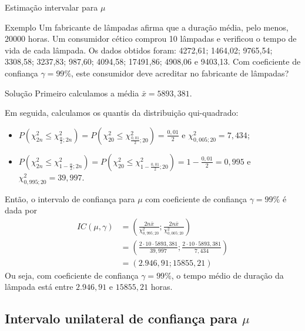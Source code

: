 \documentclass[8pt]{beamer}
\begin{document}
\begin{frame}{Estimação intervalar para $\mu$}

\footnotesize

\begin{block}{Exemplo}
	Um fabricante de lâmpadas afirma que a duração média, pelo menos, $20000$  horas. Um consumidor cético comprou 10 lâmpadas e verificou o tempo de vida de cada lâmpada. Os dados obtidos foram: 4272,61;  1464,02;  9765,54;  3308,58;  3237,83;   987,60;  4094,58; 17491,86;  4908,06 e  9403,13. Com coeficiente de confiança $\gamma=99\%$, este consumidor deve acreditar no fabricante de lâmpadas?
\end{block}

\begin{block}{Solução}
	Primeiro calculamos a média $\bar{x} = 5893,381$.
	
	Em seguida, calculamos os quantis da distribuição qui-quadrado:
	\begin{itemize}
		\item $P\left(\chi^2_{2n} \leq \chi^2_{\frac{\alpha}{2};2n}\right) = P\left(\chi^2_{20} \leq \chi^2_{\frac{0,01}{2};20}\right) = \frac{0,01}{2}$ e $\chi^2_{0,005;20} = 7,434$;
		\item $P\left(\chi^2_{2n} \leq \chi^2_{1-\frac{\alpha}{2};2n}\right) = P\left(\chi^2_{20} \leq \chi^2_{1-\frac{0,01}{2};20}\right) =1- \frac{0,01}{2}=0,995$ e $\chi^2_{0,995;20} = 39,997$.
	\end{itemize}
	Então, o intervalo de confiança para $\mu$ com coeficiente de confiança $\gamma=99\%$ é dada por
	\begin{align*}
		IC(\mu, \gamma) &= \left( \frac{2n \bar{x}}{\chi^2_{0,995;20}}; \frac{2n \bar{x}}{\chi^2_{0,005;20}}  \right)\\
		&= \left( \frac{2\cdot 10 \cdot 5893,381}{39,997}; \frac{2\cdot 10 \cdot 5893,381}{7,434}  \right)\\
		&= \left( 2.946,91; 15855,21 \right)
	\end{align*}
	Ou seja, com  coeficiente de confiança $\gamma=99\%$, o tempo médio de duração da lâmpada está entre $2.946,91$ e $15855,21$ horas.
\end{block}

\normalsize

\end{frame}

\subsection{Intervalo unilateral de confiança para $\mu$}
\end{document}
